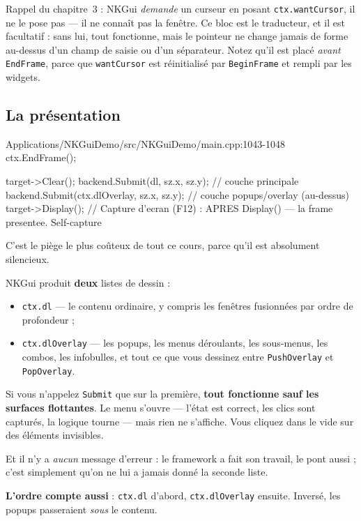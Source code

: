 Rappel du chapitre~3 : NKGui \emph{demande} un curseur en posant
\texttt{ctx.wantCursor}, il ne le pose pas — il ne connaît pas la fenêtre. Ce
bloc est le traducteur, et il est facultatif : sans lui, tout fonctionne, mais
le pointeur ne change jamais de forme au-dessus d'un champ de saisie ou d'un
séparateur. Notez qu'il est placé \emph{avant} \texttt{EndFrame}, parce que
\texttt{wantCursor} est réinitialisé par \texttt{BeginFrame} et rempli par les
widgets.

\subsection{La présentation}

\begin{nkcode}{Applications/NKGuiDemo/src/NKGuiDemo/main.cpp:1043-1048}
        ctx.EndFrame();

        target->Clear();
        backend.Submit(dl, sz.x, sz.y);               // couche principale
        backend.Submit(ctx.dlOverlay, sz.x, sz.y); // couche popups/overlay (au-dessus)
        target->Display(); // Capture d'ecran (F12) : APRES Display() — la frame presentee. Self-capture
\end{nkcode}

\begin{nkpiege}
C'est le piège le plus coûteux de tout ce cours, parce qu'il est absolument
silencieux.

NKGui produit \textbf{deux} listes de dessin :
\begin{itemize}
  \item \texttt{ctx.dl} — le contenu ordinaire, y compris les fenêtres fusionnées
        par ordre de profondeur ;
  \item \texttt{ctx.dlOverlay} — les popups, les menus déroulants, les
        sous-menus, les combos, les infobulles, et tout ce que vous dessinez
        entre \texttt{PushOverlay} et \texttt{PopOverlay}.
\end{itemize}

Si vous n'appelez \texttt{Submit} que sur la première, \textbf{tout fonctionne
sauf les surfaces flottantes}. Le menu s'ouvre — l'état est correct, les clics
sont capturés, la logique tourne — mais rien ne s'affiche. Vous cliquez dans le
vide sur des éléments invisibles.

Et il n'y a \emph{aucun} message d'erreur : le framework a fait son travail, le
pont aussi ; c'est simplement qu'on ne lui a jamais donné la seconde liste.

\textbf{L'ordre compte aussi} : \texttt{ctx.dl} d'abord, \texttt{ctx.dlOverlay}
ensuite. Inversé, les popups passeraient \emph{sous} le contenu.
\end{nkpiege}

